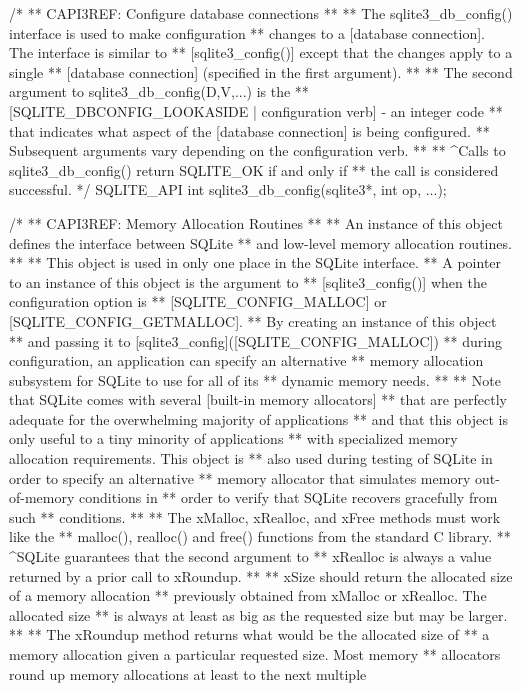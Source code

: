 \begin{Codex}[label=sqlite3.h,numbers=left]
{/*
** CAPI3REF: Configure database connections
**
** The sqlite3_db_config() interface is used to make configuration
** changes to a [database connection].  The interface is similar to
** [sqlite3_config()] except that the changes apply to a single
** [database connection] (specified in the first argument).
**
** The second argument to sqlite3_db_config(D,V,...)  is the
** [SQLITE_DBCONFIG_LOOKASIDE | configuration verb] - an integer code 
** that indicates what aspect of the [database connection] is being configured.
** Subsequent arguments vary depending on the configuration verb.
**
** ^Calls to sqlite3_db_config() return SQLITE_OK if and only if
** the call is considered successful.
*/
SQLITE_API int sqlite3_db_config(sqlite3*, int op, ...);

/*
** CAPI3REF: Memory Allocation Routines
**
** An instance of this object defines the interface between SQLite
** and low-level memory allocation routines.
**
** This object is used in only one place in the SQLite interface.
** A pointer to an instance of this object is the argument to
** [sqlite3_config()] when the configuration option is
** [SQLITE_CONFIG_MALLOC] or [SQLITE_CONFIG_GETMALLOC].  
** By creating an instance of this object
** and passing it to [sqlite3_config]([SQLITE_CONFIG_MALLOC])
** during configuration, an application can specify an alternative
** memory allocation subsystem for SQLite to use for all of its
** dynamic memory needs.
**
** Note that SQLite comes with several [built-in memory allocators]
** that are perfectly adequate for the overwhelming majority of applications
** and that this object is only useful to a tiny minority of applications
** with specialized memory allocation requirements.  This object is
** also used during testing of SQLite in order to specify an alternative
** memory allocator that simulates memory out-of-memory conditions in
** order to verify that SQLite recovers gracefully from such
** conditions.
**
** The xMalloc, xRealloc, and xFree methods must work like the
** malloc(), realloc() and free() functions from the standard C library.
** ^SQLite guarantees that the second argument to
** xRealloc is always a value returned by a prior call to xRoundup.
**
** xSize should return the allocated size of a memory allocation
** previously obtained from xMalloc or xRealloc.  The allocated size
** is always at least as big as the requested size but may be larger.
**
** The xRoundup method returns what would be the allocated size of
** a memory allocation given a particular requested size.  Most memory
** allocators round up memory allocations at least to the next multiple
}
\end{Codex}
